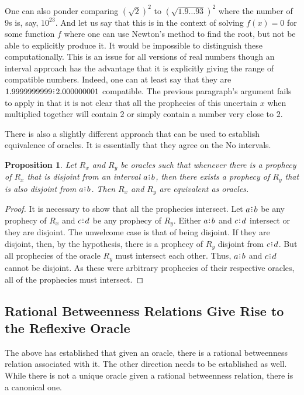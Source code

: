 \documentclass[12pt]{article}
\newtheorem{proposition}{Proposition}[section]
\begin{document}
One can also ponder comparing $(\sqrt{2})^2$ to $(\sqrt{1.9\ldots93})^2$ where the number of 9s is, say, $10^{23}$. And let us say that this is in the context of solving $f(x) = 0$ for some function $f$ where one can use Newton's method to find the root, but not be able to explicitly produce it. It would be impossible to distinguish these computationally. This is an issue for all versions of real numbers though an interval approach has the advantage that it is explicitly giving the range of compatible numbers. Indeed, one can at least say that they are $1.9999999999\rint 2.000000001$ compatible. The previous paragraph's argument fails to apply in that it is not clear that all the prophecies of this uncertain $x$ when multiplied together will contain $2$ or simply contain a number very close to $2$. 

There is also a slightly different approach that can be used to establish equivalence of oracles. It is essentially that they agree on the No intervals. 

\begin{proposition}
    Let $R_x$ and $R_y$ be oracles such that whenever there is a prophecy of $R_x$ that is disjoint from an interval $a\rint b$, then there exists a prophecy of $R_y$ that is also disjoint from $a\rint b$. Then $R_x$ and $R_y$ are equivalent as oracles. 
\end{proposition}

\begin{proof}
    It is necessary to show that all the prophecies intersect. Let $a\rint b$ be any prophecy of $R_x$ and $c\rint d$ be any prophecy of $R_y$. Either $a\rint b$ and $c\rint d$ intersect or they are disjoint. The unwelcome case is that of being disjoint. If they are disjoint, then, by the hypothesis, there is a prophecy of $R_y$ disjoint from $c\rint d$. But all prophecies of the oracle $R_y$ must intersect each other. Thus,  $a\rint b$ and $c\rint d$ cannot be disjoint. As these were arbitrary prophecies of their respective oracles, all of the prophecies must intersect. 
\end{proof}



\subsection{Rational Betweenness Relations Give Rise to the Reflexive Oracle}

The above has established that given an oracle, there is a rational betweenness relation associated with it. The other direction needs to be established as well. While there is not a unique oracle given a rational betweenness relation, there is a canonical one. 
\end{document}

